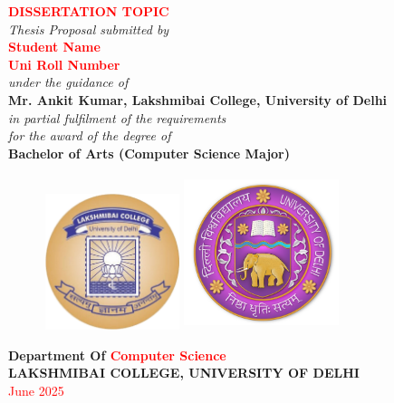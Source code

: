 \documentclass[12pt]{article}
\begin{document}
\begin{titlepage}
    \centering

    {\LARGE \bfseries \textcolor{red}{DISSERTATION TOPIC}}\\[2cm]

    \textit{Thesis Proposal submitted by}\\[0.5cm]
    {\bfseries \textcolor{red}{Student Name}}\\
    {\bfseries \textcolor{red}{Uni Roll Number}}\\[1cm]

    \textit{under the guidance of}\\[0.35cm]
    {\bfseries Mr. Ankit Kumar, Lakshmibai College, University of Delhi}\\[1.2cm]

    \textit{in partial fulfilment of the requirements}\\
    \textit{for the award of the degree of}\\[0.5cm]

    {\bfseries Bachelor of Arts (Computer Science Major)}\\[1.5cm]


    \begin{figure}[h]
        \centering
        \begin{minipage}[r]{0.245\textwidth}
            \centering
            \includegraphics[height=1.56in, width=1.56in, keepaspectratio]{lbc-latest-logo PNG.png}
        \end{minipage}%
        \begin{minipage}[l]{0.245\textwidth}
            \centering
            \includegraphics[height=1.78in, width=1.78in, keepaspectratio]{DU Logo2.png}
        \end{minipage}
    \end{figure}


    \vspace{1.5cm}

    {\large \textbf{Department Of \textcolor{red}{Computer Science}}}\\[0.5cm]
    {\large \textbf{LAKSHMIBAI COLLEGE, UNIVERSITY OF DELHI}}\\[0.5cm]
    {\large \textcolor{red}{June 2025}}

\end{titlepage}
\end{document}
